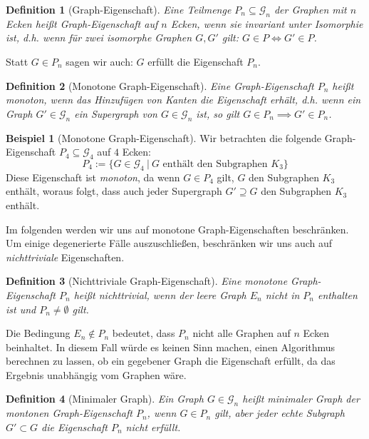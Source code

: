 \documentclass[a4paper]{scrreprt}
\newtheorem{definition}{Definition}
\theoremstyle{definition}
\newtheorem{example}{Beispiel}
\begin{document}
\begin{definition}[Graph-Eigenschaft]
Eine Teilmenge $P_n \subseteq \mathcal{G}_n$ der Graphen mit
$n$ Ecken heißt \emph{Graph-Eigenschaft auf $n$ Ecken},
wenn sie invariant unter Isomorphie ist,
d.h. wenn für zwei isomorphe Graphen $G, G'$ gilt:
$G \in P \iff G' \in P$.
\end{definition}
Statt $G \in P_n$ sagen wir auch: $G$ erfüllt die Eigenschaft $P_n$.


\begin{definition}[Monotone Graph-Eigenschaft]
Eine Graph-Eigenschaft $P_n$ heißt \emph{monoton}, wenn das
Hinzufügen von Kanten die Eigenschaft erhält,
d.h. wenn ein Graph
$G' \in \mathcal{G}_n$ ein Supergraph von
$G \in \mathcal{G}_n$ ist, so gilt 
$G \in P_n \implies G' \in P_n$.
\end{definition}

\begin{example}[Monotone Graph-Eigenschaft]
\label{exmpl:Monotonie}
Wir betrachten die folgende Graph-Eigenschaft 
$P_4 \subseteq \mathcal{G}_4$ auf $4$ Ecken:
$$P_4 := \{ G \in \mathcal{G}_4 \ | \ G \text{ enthält den Subgraphen } K_3 \}$$
Diese Eigenschaft ist \emph{monoton}, da wenn 
$G \in P_4$ gilt, $G$ den Subgraphen $K_3$
enthält, woraus folgt, dass auch jeder Supergraph $G'\supseteq G$
den Subgraphen $K_3$ enthält. 
\end{example}

Im folgenden werden wir uns auf monotone Graph-Eigenschaften beschränken.
Um einige degenerierte Fälle auszuschließen, beschränken
wir uns auch auf \emph{nichttriviale} Eigenschaften.
\begin{definition}[Nichttriviale Graph-Eigenschaft]
Eine monotone Graph-Eigenschaft $P_n$ heißt \emph{nichttrivial},
wenn der leere Graph $E_n$ nicht in $P_n$ enthalten ist und
$P_n\neq \emptyset$ gilt.
\end{definition}
Die Bedingung $E_n \notin P_n$ bedeutet, dass $P_n$ nicht
alle Graphen auf $n$ Ecken beinhaltet. In diesem Fall würde
es keinen Sinn machen, einen Algorithmus berechnen zu lassen,
ob ein gegebener Graph die Eigenschaft erfüllt, da das Ergebnis
unabhängig vom Graphen wäre.

\begin{definition}[Minimaler Graph]
Ein Graph $G \in \mathcal{G}_n$ heißt
\emph{minimaler Graph der montonen Graph-Eigenschaft $P_n$},
wenn $G \in P_n$ gilt, aber jeder echte Subgraph 
$G' \subset G$ die Eigenschaft $P_n$ nicht erfüllt.
\end{definition}
\end{document}
